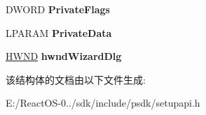 \begin{DoxyCompactItemize}
D\+W\+O\+RD {\bfseries Private\+Flags}
\item 
\mbox{\label{struct___s_p___i_n_s_t_a_l_l_w_i_z_a_r_d___d_a_t_a_a5732fe087b2c5ca522e21aa5ac6cf7fd}} 
L\+P\+A\+R\+AM {\bfseries Private\+Data}
\item 
\mbox{\label{struct___s_p___i_n_s_t_a_l_l_w_i_z_a_r_d___d_a_t_a_a99b6ca16208aa700a7705547758e2c93}} 
\hyperlink{interfacevoid}{H\+W\+ND} {\bfseries hwnd\+Wizard\+Dlg}
\end{DoxyCompactItemize}


该结构体的文档由以下文件生成\+:\begin{DoxyCompactItemize}
\item 
E\+:/\+React\+O\+S-\/0../sdk/include/psdk/setupapi.\+h\end{DoxyCompactItemize}
